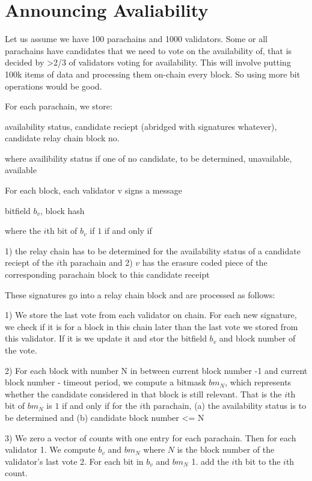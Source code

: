 \section{Announcing Avaliability}\label{voting}

Let us assume we have 100 parachains and 1000 validators. Some or all parachains have candidates that we need to vote on the availability of, that is decided by >2/3 of validators voting for availability. This will involve putting 100k items of data and processing them on-chain every block. So using more bit operations would be good.

For each parachain, we store:

availability status, candidate reciept (abridged with signatures whatever), candidate relay chain block no.

where availibility status if one of {no candidate, to be determined, unavailable, available}

For each block, each validator v signs a message

bitfield $b_v$, block hash

where the $i$th bit of $b_v$ if $1$ if and only if 

1) the relay chain has to be determined for the availability status of a candidate reciept of the $i$th parachain and 
2) $v$ has the erasure coded piece of the corresponding parachain block to this candidate receipt

These signatures go into a relay chain block and are processed as follows:

1) We store the last vote from each validator on chain. For each new signature, we check if it is for a block in this chain later than the last vote we stored from this validator. If it is we update it and stor the bitfield $b_v$ and block number of the vote.

2) For each block with number N in between current block number -1 and current block number - timeout period, we compute a bitmask $bm_N$, which represents whether the candidate considered in that block is still relevant. That is the $i$th bit of $bm_N$ is $1$ if and only if for the $i$th parachain, 
    (a) the availability status is to be determined and
    (b) candidate block number <= N
    
3) We zero a vector of counts with one entry for each parachain. Then for each validator
    1. We compute 
    $b_v$ and $bm_N$ 
    where $N$ is the block number of the validator's last vote
    2. For each bit in $b_v$ and $bm_N$
        1. add the $i$th bit to the $i$th count.
        

